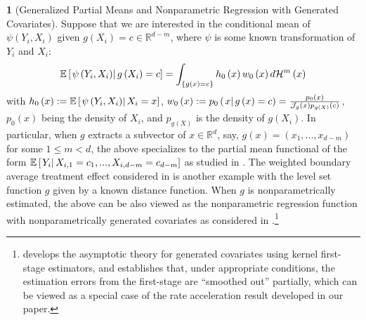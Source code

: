 \documentclass[12pt,american]{article}
\theoremstyle{definition}
\newtheorem{example}{\protect\examplename}
\theoremstyle{plain}
\theoremstyle{definition}
\theoremstyle{plain}
\theoremstyle{plain}
\theoremstyle{plain}
\theoremstyle{plain}
\theoremstyle{plain}
\newcommand{\R}{\mathbb{R}}
\newcommand{\E}{\mathbb{E}}
\providecommand{\examplename}{Example}
\providecommand{\examplename}{Example}
\begin{document}
\begin{example}[Generalized Partial Means and Nonparametric Regression with Generated Covariates]
  \label{exa:EY_gX} Suppose that we are interested in the conditional
  mean of $\psi\left(Y_{i},X_{i}\right)$ given  $g\left(X_{i}\right)=c\in\R^{d-m}$,
  where $\psi$ is some known transformation of $Y_{i}$ and $X_{i}$:
  \[
    \E\left[\rest{\psi\left(Y_{i},X_{i}\right)}g\left(X_{i}\right)=c\right]=\int_{\left\{ g\left(x\right)=c\right\} }h_{0}\left(x\right)w_{0}\left(x\right)d{\cal H}^{m}\left(x\right)
  \]
  with $h_{0}\left(x\right):=\E\left[\rest{\psi\left(Y_{i},X_{i}\right)}X_{i}=x\right]$,
  $w_{0}\left(x\right):=p_{0}\left(\left.x\right|g\left(x\right)=c\right)=\frac{p_{0}\left(x\right)}{\mathcal{J}_g(x)p_{g\left(X\right)}\left(c\right)}$,
  $p_{0}\left(x\right)$ being the density of $X_{i}$, and $p_{g\left(X\right)}$
  is the density of $g(X_i)$. In particular, when $g$ extracts
  a subvector of $x\in\R^{d}$, say, $g\left(x\right)=\left(x_{1},...,x_{d-m}\right)$
  for some $1\leq m<d$, the above specializes to the partial mean functional
  of the form $\E\left[\rest{Y_{i}}X_{i,1}=c_{1},...,X_{i,d-m}=c_{d-m}\right]$
  as studied in \citet*{newey1994kernel}. The weighted boundary average treatment effect considered in \cite*{cattaneo2025dist} is another example with the level set function $g$ given by a known distance function. When $g$ is nonparametrically estimated, the above can be also viewed as the nonparametric regression function with nonparametrically generated covariates as considered in \cite*{mammen2012nonparametric}.\footnote{\cite*{mammen2012nonparametric} develops the asymptotic theory for generated covariates using kernel first-stage estimators, and establishes that, under appropriate conditions, the estimation errors from the first-stage are ``smoothed out'' partially, which can be viewed as a special case of the rate acceleration result developed in our paper.}
\end{example}
\end{document}
